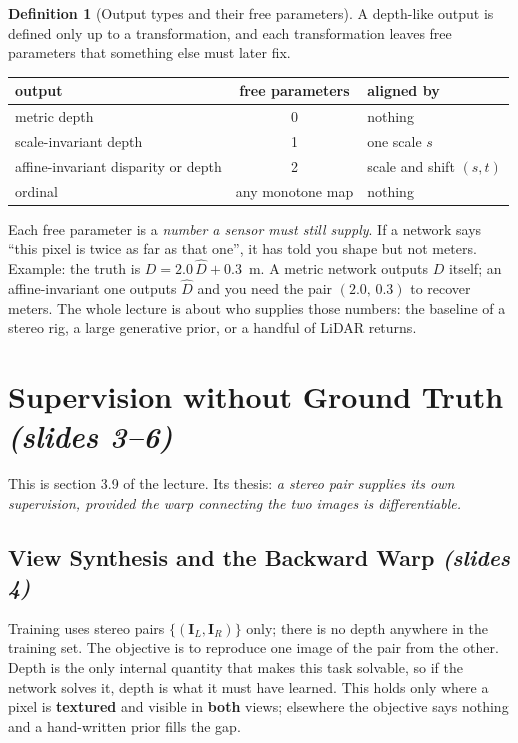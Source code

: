 \documentclass[11pt,a4paper]{article}
\newcommand{\slides}[1]{\texorpdfstring{\emph{(slides #1)}}{(slides #1)}}
\theoremstyle{plain}
\theoremstyle{definition}
\newtheorem{definition}[theorem]{Definition}
\numberwithin{equation}{section}
\begin{document}
\begin{definition}[Output types and their free parameters]
A depth-like output is defined only up to a transformation, and each transformation leaves free parameters that something else must later fix.
\begin{center}\small
\begin{tabular}{@{}lcl@{}}\toprule
output & free parameters & aligned by\\\midrule
metric depth & 0 & nothing\\
scale-invariant depth & 1 & one scale $s$\\
affine-invariant disparity or depth & 2 & scale and shift $(s,t)$\\
ordinal & any monotone map & nothing\\\bottomrule
\end{tabular}
\end{center}
\end{definition}

\begin{intuition}
Each free parameter is a \emph{number a sensor must still supply}. If a network says ``this pixel is twice as far as that one'', it has told you shape but not meters. Example: the truth is $D=2.0\,\hat D+0.3$~m. A metric network outputs $D$ itself; an affine-invariant one outputs $\hat D$ and you need the pair $(2.0,\,0.3)$ to recover meters. The whole lecture is about who supplies those numbers: the baseline of a stereo rig, a large generative prior, or a handful of LiDAR returns.
\end{intuition}

\section{Supervision without Ground Truth \slides{3--6}}
This is section 3.9 of the lecture. Its thesis: \emph{a stereo pair supplies its own supervision, provided the warp connecting the two images is differentiable.}

\subsection{View Synthesis and the Backward Warp \slides{4}}
Training uses stereo pairs $\{(\bm I_L,\bm I_R)\}$ only; there is no depth anywhere in the training set. The objective is to reproduce one image of the pair from the other. Depth is the only internal quantity that makes this task solvable, so if the network solves it, depth is what it must have learned. This holds only where a pixel is \textbf{textured} and visible in \textbf{both} views; elsewhere the objective says nothing and a hand-written prior fills the gap.
\end{document}

